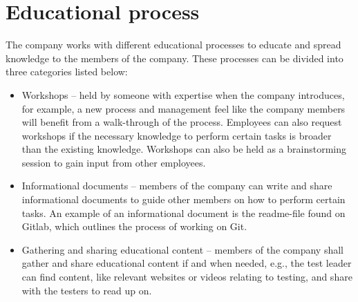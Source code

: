 \section{Educational process}
\label{sec:eduproc}

The company works with different educational processes to educate and spread knowledge to the members of the company. These processes can be divided into three categories listed below:

\begin{itemize}
    \item Workshops – held by someone with expertise when the company introduces, for example, a new process and management feel like the company members will benefit from a walk-through of the process. Employees can also request workshops if the necessary knowledge to perform certain tasks is broader than the existing knowledge. Workshops can also be held as a brainstorming session to gain input from other employees.
    \item Informational documents – members of the company can write and share informational documents to guide other members on how to perform certain tasks. An example of an informational document is the readme-file found on Gitlab, which outlines the process of working on Git.
    \item Gathering and sharing educational content – members of the company shall gather and share educational content if and when needed, e.g., the test leader can find content, like relevant websites or videos relating to testing, and share with the testers to read up on. 
\end{itemize}
